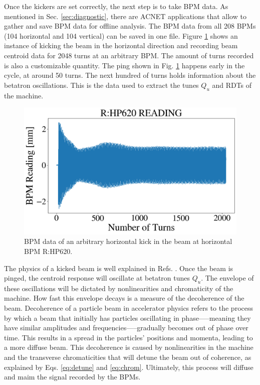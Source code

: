 Once the kickers are set correctly, the next step is to take BPM data. As mentioned in Sec. \ref{sec:diagnostic}, there are ACNET applications that allow to gather and save BPM data for offline analysis. The BPM data from all 208 BPMs (104 horizontal and 104 vertical) can be saved in one file. Figure \ref{fig:bpm_kick0} shows an instance of kicking the beam in the horizontal direction and recording beam centroid data for 2048 turns at an arbitrary BPM. The amount of turns recorded is also a customizable quantity. The ping shown in Fig. \ref{fig:bpm_kick0} happens early in the cycle, at around 50 turns. The next hundred of turns holds information about the betatron oscillations. This is the data used to extract the tunes $Q_u$ and RDTs of the machine.

\begin{figure}[H]
    \centering
    \includegraphics[width=\columnwidth]{chapter4/bpm_kick.png}
    \caption{BPM data of an arbitrary horizontal kick in the beam at horizontal BPM R:HP620.}
    \label{fig:bpm_kick0}
\end{figure}

The physics of a kicked beam is well explained in Refs. \cite{decoherence1,decoherence2}. Once the beam is pinged, the centroid response will oscillate at betatron tunes $Q_u$. The envelope of these oscillations will be dictated by nonlinearities and chromaticity of the machine. How fast this envelope decays is a measure of the decoherence of the beam. Decoherence of a particle beam in accelerator physics refers to the process by which a beam that initially has particles oscillating in phase—--meaning they have similar amplitudes and frequencies—--gradually becomes out of phase over time. This results in a spread in the particles' positions and momenta, leading to a more diffuse beam. This decoherence is caused by nonlinearities in the machine and the transverse chromaticities that will detune the beam out of coherence, as explained by Eqs. \ref{eq:detune} and \ref{eq:chrom}. Ultimately, this process will diffuse and maim the signal recorded by the BPMs. 

